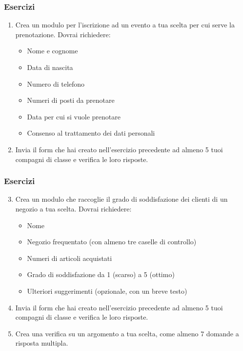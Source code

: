 \documentclass[handout]{beamer}
\begin{document}
\begin{frame}
\frametitle{Esercizi}
\begin{enumerate}
  \item Crea un modulo per l'iscrizione ad un evento a tua scelta per cui serve la prenotazione. Dovrai richiedere:
  \begin{itemize}
    \item Nome e cognome
    \item Data di nascita
    \item Numero di telefono
    \item Numeri di posti da prenotare
    \item Data per cui si vuole prenotare
    \item Consenso al trattamento dei dati personali
  \end{itemize}
  \item Invia il form che hai creato nell'esercizio precedente ad almeno 5 tuoi compagni di classe e verifica le loro risposte.
\end{enumerate}
\end{frame}






\begin{frame}
\frametitle{Esercizi}
\begin{enumerate}\setcounter{enumi}{2}
  \item Crea un modulo che raccoglie il grado di soddisfazione dei clienti di un negozio a tua scelta. Dovrai richiedere:
  \begin{itemize}
    \item Nome
    \item Negozio frequentato (con almeno tre caselle di controllo)
    \item Numeri di articoli acquistati
    \item Grado di soddisfazione da 1 (scarso) a 5 (ottimo)
    \item Ulteriori suggerimenti (opzionale, con un breve testo)
  \end{itemize}
  \item Invia il form che hai creato nell'esercizio precedente ad almeno 5 tuoi compagni di classe e verifica le loro risposte.
  \item Crea una verifica su un argomento a tua scelta, come almeno 7 domande a risposta multipla.
\end{enumerate}
\end{frame}
\end{document}
